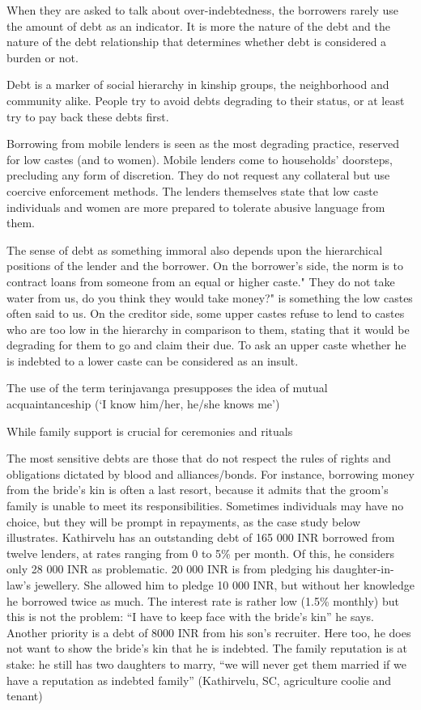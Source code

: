 \documentclass[a4paper, 11pt, onecolumn]{article}
\begin{document}
When they are asked to talk about over-indebtedness, the borrowers rarely use
the amount of debt as an indicator. It is more the nature of the debt and the nature of the debt
relationship that determines whether debt is considered a burden or not.

Debt is a marker of social hierarchy in
kinship groups, the neighborhood and community alike. People try to avoid debts degrading
to their status, or at least try to pay back these debts first.

Borrowing from mobile lenders is seen as the most degrading practice, reserved for low castes
(and to women). Mobile lenders come to households’ doorsteps, precluding any form of
discretion. They do not request any collateral but use coercive enforcement methods. The
lenders themselves state that low caste individuals and women are more prepared to tolerate
abusive language from them.

The sense of debt as something immoral also depends upon the hierarchical positions of the
lender and the borrower. On the borrower’s side, the norm is to contract loans from someone
from an equal or higher caste." They do not take water from us, do you think they would take
money?" is something the low castes often said to us. On the creditor side, some upper castes
refuse to lend to castes who are too low in the hierarchy in comparison to them, stating that it
would be degrading for them to go and claim their due. To ask an upper caste whether he is
indebted to a lower caste can be considered as an insult.

The use of the term terinjavanga presupposes the idea of mutual
acquaintanceship (‘I know him/her, he/she knows me’)

While family support is crucial for
ceremonies and rituals

The most sensitive debts are those that do not respect the rules of rights and
obligations dictated by blood and alliances/bonds. For instance, borrowing money
from the bride’s kin is often a last resort, because it admits that the groom’s family is
unable to meet its responsibilities. Sometimes individuals may have no choice, but they
will be prompt in repayments, as the case study below illustrates.
Kathirvelu has an outstanding debt of 165 000 INR borrowed from twelve lenders, at rates ranging from 0 to
5\% per month. Of this, he considers only 28 000 INR as problematic. 20 000 INR is from pledging his
daughter-in-law’s jewellery. She allowed him to pledge 10 000 INR, but without her knowledge he
borrowed twice as much. The interest rate is rather low (1.5\% monthly) but this is not the problem: “I have
to keep face with the bride’s kin” he says. Another priority is a debt of 8000 INR from his son’s recruiter.
Here too, he does not want to show the bride’s kin that he is indebted. The family reputation is at stake: he
still has two daughters to marry, “we will never get them married if we have a reputation as indebted
family” (Kathirvelu, SC, agriculture coolie and tenant)
\end{document}
